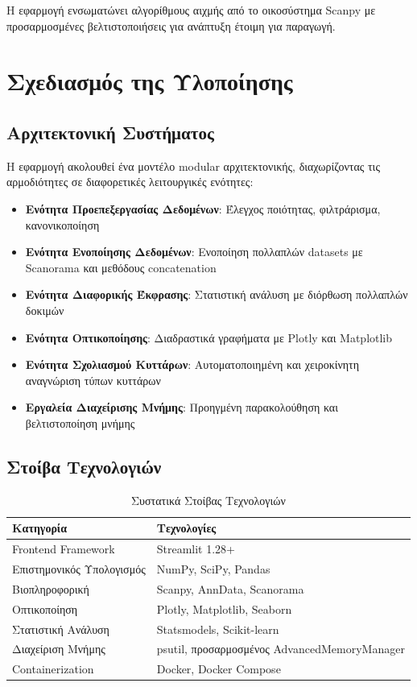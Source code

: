 \documentclass[11pt,a4paper]{article}
\begin{document}
Η εφαρμογή ενσωματώνει αλγορίθμους αιχμής από το οικοσύστημα Scanpy με προσαρμοσμένες βελτιστοποιήσεις για ανάπτυξη έτοιμη για παραγωγή.

\section{Σχεδιασμός της Υλοποίησης}

\subsection{Αρχιτεκτονική Συστήματος}

Η εφαρμογή ακολουθεί ένα μοντέλο modular αρχιτεκτονικής, διαχωρίζοντας τις αρμοδιότητες σε διαφορετικές λειτουργικές ενότητες:

\begin{itemize}
    \item \textbf{Ενότητα Προεπεξεργασίας Δεδομένων}: Έλεγχος ποιότητας, φιλτράρισμα, κανονικοποίηση
    \item \textbf{Ενότητα Ενοποίησης Δεδομένων}: Ενοποίηση πολλαπλών datasets με Scanorama και μεθόδους concatenation
    \item \textbf{Ενότητα Διαφορικής Έκφρασης}: Στατιστική ανάλυση με διόρθωση πολλαπλών δοκιμών
    \item \textbf{Ενότητα Οπτικοποίησης}: Διαδραστικά γραφήματα με Plotly και Matplotlib
    \item \textbf{Ενότητα Σχολιασμού Κυττάρων}: Αυτοματοποιημένη και χειροκίνητη αναγνώριση τύπων κυττάρων
    \item \textbf{Εργαλεία Διαχείρισης Μνήμης}: Προηγμένη παρακολούθηση και βελτιστοποίηση μνήμης
\end{itemize}

\subsection{Στοίβα Τεχνολογιών}

\begin{table}[H]
\centering
\caption{Συστατικά Στοίβας Τεχνολογιών}
\begin{tabular}{@{}ll@{}}
\toprule
\textbf{Κατηγορία} & \textbf{Τεχνολογίες} \\
\midrule
Frontend Framework & Streamlit 1.28+ \\
Επιστημονικός Υπολογισμός & NumPy, SciPy, Pandas \\
Βιοπληροφορική & Scanpy, AnnData, Scanorama \\
Οπτικοποίηση & Plotly, Matplotlib, Seaborn \\
Στατιστική Ανάλυση & Statsmodels, Scikit-learn \\
Διαχείριση Μνήμης & psutil, προσαρμοσμένος AdvancedMemoryManager \\
Containerization & Docker, Docker Compose \\
\bottomrule
\end{tabular}
\end{table}
\end{document}
